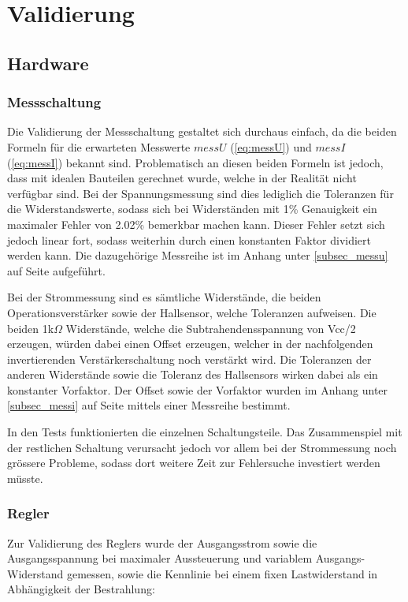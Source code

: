 \section{Validierung}

\subsection{Hardware}

\subsubsection{Messschaltung}
Die Validierung der Messschaltung gestaltet sich durchaus einfach, da die beiden Formeln für die erwarteten Messwerte $messU$ (\ref{eq:messU}) und $messI$ (\ref{eq:messI}) bekannt sind. Problematisch an diesen beiden Formeln ist jedoch, dass mit idealen Bauteilen gerechnet wurde, welche in der Realität nicht verfügbar sind. Bei der Spannungsmessung sind dies lediglich die Toleranzen für die Widerstandswerte, sodass sich bei Widerständen mit 1\% Genauigkeit ein maximaler Fehler von 2.02\% bemerkbar machen kann. Dieser Fehler setzt sich jedoch linear fort, sodass weiterhin durch einen konstanten Faktor dividiert werden kann. Die dazugehörige Messreihe ist im Anhang unter \ref{subsec_messu} auf Seite \pageref{subsec_messu} aufgeführt.

Bei der Strommessung sind es sämtliche Widerstände, die beiden Operationsverstärker sowie der Hallsensor, welche Toleranzen aufweisen. Die beiden 1k$\Omega$ Widerstände, welche die Subtrahendensspannung von Vcc/2 erzeugen, würden dabei einen Offset erzeugen, welcher in der nachfolgenden invertierenden Verstärkerschaltung noch verstärkt wird. Die Toleranzen der anderen Widerstände sowie die Toleranz des Hallsensors wirken dabei als ein konstanter Vorfaktor. Der Offset sowie der Vorfaktor wurden im Anhang unter \ref{subsec_messi} auf Seite \pageref{subsec_messi} mittels einer Messreihe bestimmt.

In den Tests funktionierten die einzelnen Schaltungsteile. Das Zusammenspiel mit der restlichen Schaltung verursacht jedoch vor allem bei der Strommessung noch grössere Probleme, sodass dort weitere Zeit zur Fehlersuche investiert werden müsste.

\subsubsection{Regler}

Zur Validierung des Reglers wurde der Ausgangsstrom sowie die Ausgangsspannung bei maximaler Aussteuerung und variablem Ausgangs-Widerstand gemessen, sowie die Kennlinie bei einem fixen Lastwiderstand in Abhängigkeit der Bestrahlung:

